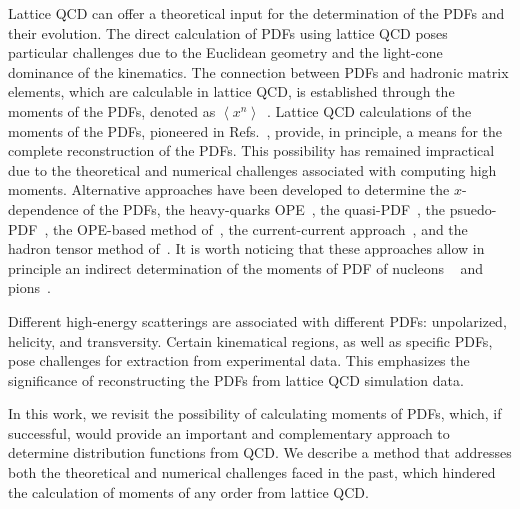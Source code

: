 Lattice QCD can offer a theoretical input for the determination of the
PDFs and their evolution.
The direct calculation of PDFs using lattice QCD poses particular challenges
due to the Euclidean geometry and the light-cone dominance of the kinematics.
The connection between PDFs and
hadronic matrix elements, which are calculable in lattice QCD, is
established through the
moments of the PDFs, denoted as
$\left\langle x^{n} \right\rangle$~\cite{Curci:1980uw,Collins:1981uw}.
Lattice QCD calculations of the moments of the PDFs,
pioneered in Refs.~\cite{Kronfeld:1984zv,Martinelli:1987zd,Martinelli:1987bh},
provide, in principle, a means for the
complete reconstruction of the PDFs.
This possibility has remained impractical
due to the theoretical and numerical challenges
associated with computing high moments.
Alternative approaches have been developed to determine
the $x$-dependence of the PDFs, the heavy-quarks OPE~\cite{Aglietti:1998mz,Detmold:2005gg},
the quasi-PDF~\cite{Ji:2013dva},
the psuedo-PDF~\cite{Radyushkin:2016hsy,Karpie:2018zaz},
the OPE-based method of~\cite{Chambers:2017dov},
the current-current approach~\cite{Braun:2007wv,Ma:2014jla},
and the hadron tensor method of~\cite{Liang:2019frk}.
It is worth noticing that these approaches allow
in principle an indirect determination of the
moments of PDF of nucleons
~\cite{HadStruc:2021qdf,Gao:2022uhg} and pions~\cite{Gao:2020ito,Gao:2022iex}.

Different high-energy scatterings are associated with different PDFs:
unpolarized, helicity, and transversity.
Certain kinematical regions, as well as specific PDFs,
pose challenges for extraction from experimental data.
This emphasizes the significance
of reconstructing the PDFs from lattice QCD simulation data.

In this work, we revisit the possibility of calculating moments of PDFs,
which, if successful, would provide an important and complementary
approach to determine distribution functions from QCD.
We describe a method that addresses both the theoretical and numerical
challenges faced in the past, which hindered the calculation of
moments of any order from lattice QCD.
